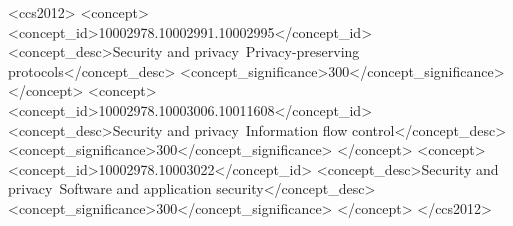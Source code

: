 \documentclass[sigconf]{acmart}
\begin{document}
\begin{sloppypar}



\begin{CCSXML}
<ccs2012>
<concept>
<concept_id>10002978.10002991.10002995</concept_id>
<concept_desc>Security and privacy~Privacy-preserving protocols</concept_desc>
<concept_significance>300</concept_significance>
</concept>
<concept>
<concept_id>10002978.10003006.10011608</concept_id>
<concept_desc>Security and privacy~Information flow control</concept_desc>
<concept_significance>300</concept_significance>
</concept>
<concept>
<concept_id>10002978.10003022</concept_id>
<concept_desc>Security and privacy~Software and application security</concept_desc>
<concept_significance>300</concept_significance>
</concept>
</ccs2012>
\end{CCSXML}


\maketitle




%







\label{lastpage}

\end{sloppypar}

\footnotesize


\end{document}
